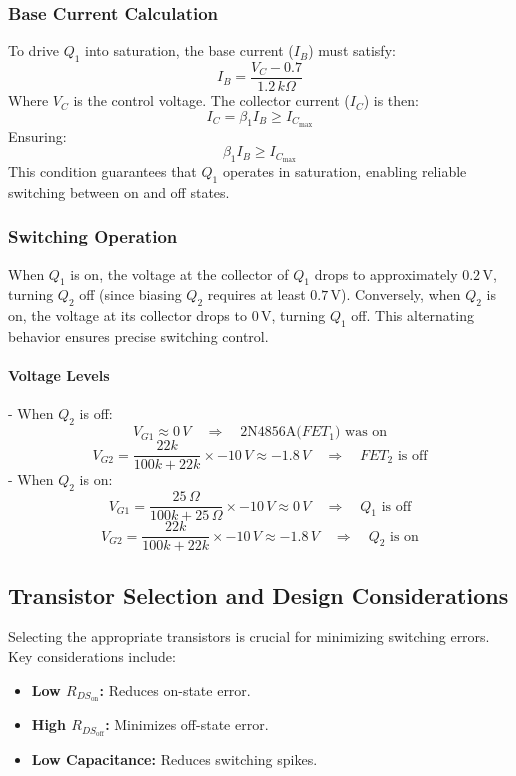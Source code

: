 \documentclass[a4paper,9pt,twoside,openany,twocolumn]{memoir}
\begin{document}
\subsubsection{Base Current Calculation}
To drive \( Q_1 \) into saturation, the base current (\( I_B \)) must satisfy:
\[
I_B = \frac{V_C - 0.7}{1.2\,k\Omega}
\]
Where \( V_C \) is the control voltage. The collector current (\( I_C \)) is then:
\[
I_C = \beta_1 I_B \geq I_{C_{\text{max}}}
\]
Ensuring:
\[
\beta_1 I_B \geq I_{C_{\text{max}}}
\]
This condition guarantees that \( Q_1 \) operates in saturation, enabling reliable switching between on and off states.

\subsubsection{Switching Operation}
When \( Q_1 \) is on, the voltage at the collector of \( Q_1 \) drops to approximately \( 0.2 \, \text{V} \), turning \( Q_2 \) off (since biasing \( Q_2 \) requires at least \( 0.7 \, \text{V} \)). Conversely, when \( Q_2 \) is on, the voltage at its collector drops to \( 0 \, \text{V} \), turning \( Q_1 \) off. This alternating behavior ensures precise switching control.


\paragraph{Voltage Levels}
- When \( Q_2 \) is off:
    \[
    V_{G1} \approx 0\,V \quad \Rightarrow \quad \text{2N4856A($FET_1$) was on}
    \]
    \[
    V_{G2} = \frac{22k}{100k + 22k} \times -10\,V \approx -1.8\,V \quad \Rightarrow \quad \text{$FET_2$ is off}
    \]
- When \( Q_2 \) is on:
    \[
    V_{G1} = \frac{25\,\Omega}{100k + 25\,\Omega} \times -10\,V \approx 0\,V \quad \Rightarrow \quad Q_1 \text{ is off}
    \]
    \[
    V_{G2} = \frac{22k}{100k + 22k} \times -10\,V \approx -1.8\,V \quad \Rightarrow \quad Q_2 \text{ is on}
    \]

\subsection{Transistor Selection and Design Considerations}
Selecting the appropriate transistors is crucial for minimizing switching errors. Key considerations include:

\begin{itemize}
    \item \textbf{Low \( R_{DS_{\text{on}}} \):} Reduces on-state error.
    \item \textbf{High \( R_{DS_{\text{off}}} \):} Minimizes off-state error.
    \item \textbf{Low Capacitance:} Reduces switching spikes.
\end{itemize}
\end{document}
